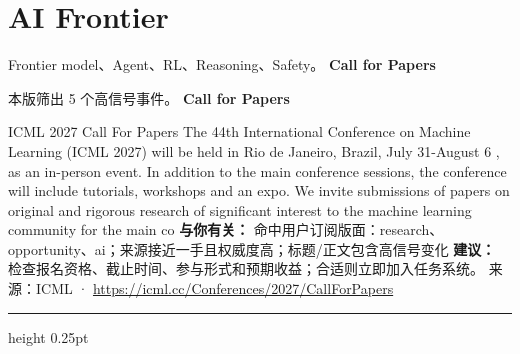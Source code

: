 \documentclass[10.5pt]{ctexart}
\begin{document}
\section*{AI Frontier}
{\color{ormuted} Frontier model、Agent、RL、Reasoning、Safety。}
\vspace{2mm}
{\LARGE\bfseries Call for Papers}\par
\vspace{1mm}
{\color{ormuted} 本版筛出 5 个高信号事件。}
\vspace{3mm}
{\Large\bfseries Call for Papers}\par
ICML 2027 Call For Papers The 44th International Conference on Machine Learning (ICML 2027) will be held in Rio de Janeiro, Brazil, July 31-August 6 , as an in-person event. In addition to the main conference sessions, the conference will include tutorials, workshops and an expo. We invite submissions of papers on original and rigorous research of significant interest to the machine learning community for the main co
\textbf{与你有关：} 命中用户订阅版面：research、opportunity、ai；来源接近一手且权威度高；标题/正文包含高信号变化
\textbf{建议：} 检查报名资格、截止时间、参与形式和预期收益；合适则立即加入任务系统。
{\footnotesize\color{ormuted} 来源：ICML · \url{https://icml.cc/Conferences/2027/CallForPapers}}
\vspace{4mm}
\hrule height 0.25pt
\vspace{3mm}
\end{document}
